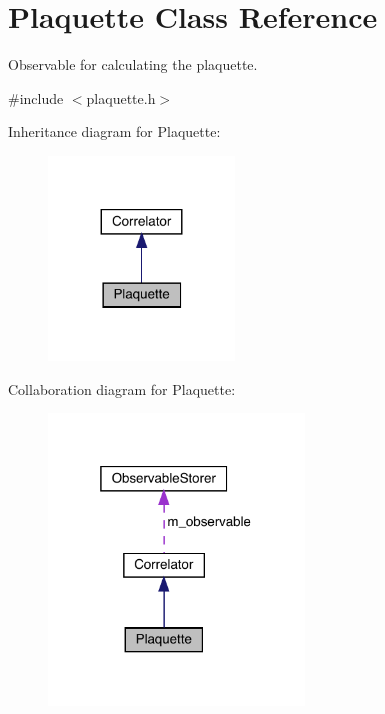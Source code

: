 \hypertarget{class_plaquette}{}\section{Plaquette Class Reference}
\label{class_plaquette}


Observable for calculating the plaquette.  




{\ttfamily \#include $<$plaquette.\+h$>$}



Inheritance diagram for Plaquette\+:\nopagebreak
\begin{figure}[H]
\begin{center}
\leavevmode
\includegraphics[width=140pt]{class_plaquette__inherit__graph}
\end{center}
\end{figure}


Collaboration diagram for Plaquette\+:\nopagebreak
\begin{figure}[H]
\begin{center}
\leavevmode
\includegraphics[width=193pt]{class_plaquette__coll__graph}
\end{center}
\end{figure}
